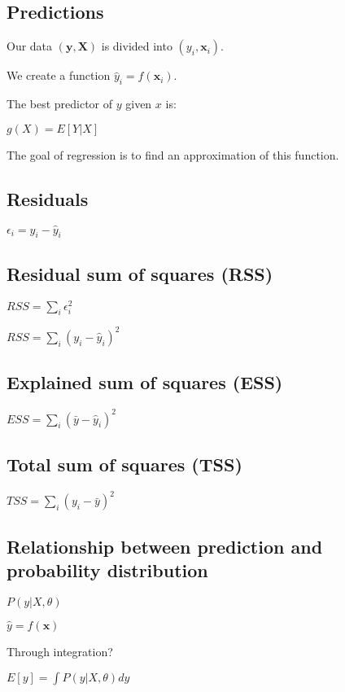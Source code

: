 
\subsection{Predictions}

Our data \((\mathbf y, \mathbf X)\) is divided into \((y_i, \mathbf x_i)\).

We create a function \(\hat y_i = f(\mathbf x_i)\).

The best predictor of \(y\) given \(x\) is:

\(g(X)=E[Y|X]\)

The goal of regression is to find an approximation of this function.

\subsection{Residuals}

\(\epsilon_i = y_i- \hat y_i\)

\subsection{Residual sum of squares (RSS)}

\(RSS=\sum_i \epsilon_i^2\)

\(RSS=\sum_i (y_i-\hat y_i)^2\)

\subsection{Explained sum of squares (ESS)}

\(ESS=\sum_i (\bar y-\hat y_i)^2\)

\subsection{Total sum of squares (TSS)}

\(TSS=\sum_i (y_i-\bar y)^2\)

\subsection{Relationship between prediction and probability distribution}

\(P(y|X, \theta )\)

\(\hat y =f(\mathbf x)\)

Through integration?

\(E[y] = \int P(y|X, \theta ) dy\)

